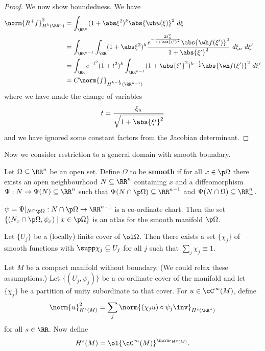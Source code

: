 \begin{proof}
  We now show boundedness.
  We have
  \begin{align*}
    \norm{R^+f}_{H^k(\RR^n)}^2 &= \int_{\RR^n} (1+\abs\xi^2)^k \abs{\wh u(\xi)}^2 \ d\xi \\
    &= \int_{\RR^{n-1}} \int_\RR (1+\abs\xi^2)^k \frac{e^{-\frac{2\xi_n^2}{1+\abs{\xi'}^2}}\abs{\wh f(\xi')}^2}{1+\abs{\xi'}^2} \ d\xi_n \ d\xi' \\
    &= \int_\RR e^{-t^2}(1+t^2)^k \int_{\RR^{n-1}} (1+\abs{\xi'}^2)^{k-\frac12} \abs{\wh f(\xi')}^2 \ d\xi' \\
      &= C\norm{f}_{H^{k-\frac12}(\RR^{n-1})}
  \end{align*}
  where we have made the change of variables
  \[ t=\frac{\xi_n}{\sqrt{1+\abs{\xi'}^2}} \]
  and we have ignored some constant factors from the Jacobian determinant.
\end{proof}

Now we consider restriction to a general domain with smooth boundary.

\begin{defn}
  Let $\Omega \subseteq \RR^n$ be an open set.
  Define $\Omega$ to be \textbf{smooth} if for all $x\in\p\Omega$ there exists an open neighbourhood $N \subseteq \RR^n$ containing $x$ and a diffeomorphism $\Psi: N \to \Psi(N) \subseteq \RR^n$ such that $\Psi(N\cap\p\Omega)\subseteq\RR^{n-1}$ and $\Psi(N\cap\Omega)\subseteq\RR_+^n$.
\end{defn}

\begin{rmk}
  $\psi = \Psi|_{N\cap\p\Omega}: N\cap\p\Omega \to \RR^{n-1}$ is a co-ordinate chart.
  Then the set $\{ (N_x\cap\p\Omega,\psi_x) \mid x \in \p\Omega \}$ is an atlas for the smooth manifold $\p\Omega$.
\end{rmk}

\begin{lem}
  Let $\{U_j\}$ be a (locally) finite cover of $\ol\Omega$.
  Then there exists a set $\{\chi_j\}$ of smooth functions with $\supp\chi_j\subseteq U_j$ for all $j$ such that $\sum_j \chi_j \equiv 1$.
\end{lem}

\begin{defn}
  Let $M$ be a compact manifold without boundary.
  (We could relax these assumptions.)
  Let $\{(U_j,\psi_j)\}$ be a co-ordinate cover of the manifold and let $\{\chi_j\}$ be a partition of unity subordinate to that cover.
  For $u\in\cC^\infty(M)$, define
  \[ \norm{u}_{H^s(M)}^2 = \sum_j \norm{(\chi_ju)\circ\psi_j\inv}_{H^s(\RR^n)} \]
  for all $s\in\RR$.
  Now define
  \[ H^s(M) = \ol{\cC^\infty(M)}^{\norm\cdot_{H^s(M)}}. \]
\end{defn}

